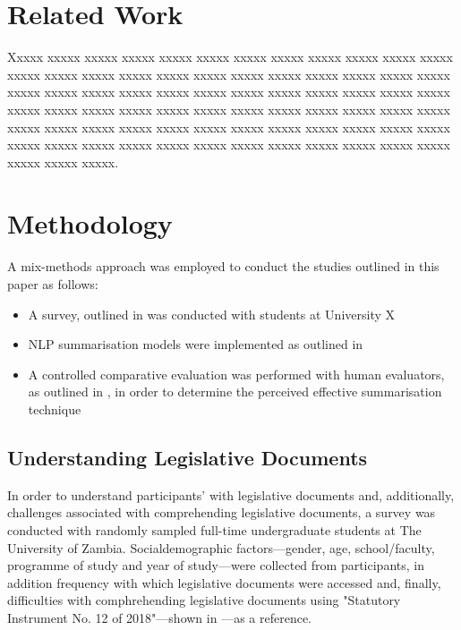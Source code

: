 \documentclass[conference]{IEEEtran}
\begin{document}
\section{Related Work}
\label{sec:related_work}
Xxxxx xxxxx xxxxx  xxxxx  xxxxx  xxxxx  xxxxx  xxxxx  xxxxx  xxxxx  xxxxx  xxxxx  xxxxx  xxxxx  xxxxx  xxxxx  xxxxx  xxxxx  xxxxx  xxxxx  xxxxx  xxxxx  xxxxx  xxxxx  xxxxx  xxxxx  xxxxx  xxxxx  xxxxx  xxxxx  xxxxx  xxxxx  xxxxx  xxxxx  xxxxx  xxxxx  xxxxx  xxxxx  xxxxx  xxxxx  xxxxx  xxxxx  xxxxx  xxxxx  xxxxx  xxxxx  xxxxx  xxxxx  xxxxx  xxxxx  xxxxx  xxxxx  xxxxx  xxxxx  xxxxx  xxxxx  xxxxx  xxxxx  xxxxx  xxxxx  xxxxx  xxxxx  xxxxx  xxxxx  xxxxx  xxxxx  xxxxx  xxxxx  xxxxx  xxxxx  xxxxx  xxxxx  xxxxx  xxxxx  xxxxx.

\section{Methodology}
\label{sec:methodology}
A mix-methods approach was employed to conduct the studies outlined in this paper as follows:
\begin{itemize}
    \item A survey, outlined in  was conducted with students at University X
    \item NLP summarisation models were implemented as outlined in 
    \item A controlled comparative evaluation was performed with human evaluators, as outlined in , in order to determine the perceived effective summarisation technique
\end{itemize}

\subsection{Understanding Legislative Documents}
\label{sec:methodology:understanding_legislation_documents}
In order to understand participants' with legislative documents and, additionally, challenges associated with comprehending legislative documents, a survey was conducted with randomly sampled full-time undergraduate students at The University of Zambia. Socialdemographic factors---gender, age, school/faculty, programme of study and year of study---were collected from participants, in addition frequency with which legislative documents were accessed and, finally, difficulties with comphrehending legislative documents using "Statutory Instrument No. 12 of 2018"---shown in ---as a reference.
\end{document}
